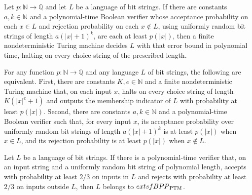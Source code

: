 \begin{theorem}
\label{Randomized.mem_BPP_PTMWith_of_inBPPWith}
\leanok
{}
Let $p:\mathbb N\to\mathbb Q$ and let $L$ be a language of bit strings. If there are
constants $a,k\in\mathbb N$ and a polynomial-time Boolean verifier whose acceptance
probability on each $x\in L$ and rejection probability on each $x\notin L$, using
uniformly random bit strings of length $a(|x|+1)^k$, are each at least $p(|x|)$, then a
finite nondeterministic Turing machine decides $L$ with that error bound in polynomial
time, halting on every choice string of the prescribed length.
\end{theorem}

\begin{theorem}
\label{Randomized.mem_BPP_PTMWith_iff}
\leanok
{}
For any function $p:\mathbb N\to\mathbb Q$ and any language $L$ of bit strings, the
following are equivalent. First, there are constants $K,e\in\mathbb N$ and a finite
nondeterministic Turing machine that, on each input $x$, halts on every choice string of
length $K(|x|^e+1)$ and outputs the membership indicator of $L$ with probability at
least $p(|x|)$. Second, there are constants $a,k\in\mathbb N$ and a polynomial-time
Boolean verifier such that, for every input $x$, its acceptance probability over
uniformly random bit strings of length $a(|x|+1)^k$ is at least $p(|x|)$ when $x\in L$,
and its rejection probability is at least $p(|x|)$ when $x\notin L$.
\end{theorem}

\begin{theorem}
\label{Randomized.mem_BPP_PTM_of_inBPP}
\leanok
{}
Let $L$ be a language of bit strings. If there is a polynomial-time verifier that, on an
input string and a uniformly random bit string of polynomial length, accepts with
probability at least $2/3$ on inputs in $L$ and rejects with probability at least $2/3$
on inputs outside $L$, then $L$ belongs to $	extsf{BPP}_{\rm PTM}$.
\end{theorem}

